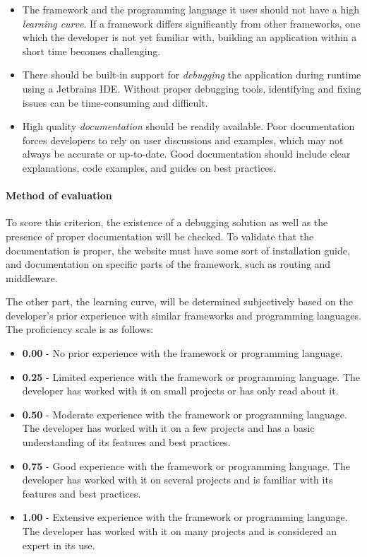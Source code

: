 \begin{itemize}
	\item The framework and the programming language it uses should not have a high \emph{learning curve}.
	      If a framework differs significantly from other frameworks, one which the developer is not yet familiar with, building an application within a short time becomes challenging.
	\item There should be built-in support for \emph{debugging} the application during runtime using a Jetbrains IDE.
	      Without proper debugging tools, identifying and fixing issues can be time-consuming and difficult.
	\item High quality \emph{documentation} should be readily available.
	      Poor documentation forces developers to rely on user discussions and examples, which may not always be accurate or up-to-date.
	      Good documentation should include clear explanations, code examples, and guides on best practices.
\end{itemize}

\paragraph{Method of evaluation}
To score this criterion, the existence of a debugging solution as well as the presence of proper documentation will be checked.
To validate that the documentation is proper, the website must have some sort of installation guide, and documentation on specific parts of the framework, such as routing and middleware.

The other part, the learning curve, will be determined subjectively based on the developer's prior experience with similar frameworks and programming languages.
The proficiency scale is as follows:

\begin{itemize}
	\item \textbf{0.00} - No prior experience with the framework or programming language.
	\item \textbf{0.25} - Limited experience with the framework or programming language.
	      The developer has worked with it on small projects or has only read about it.
	\item \textbf{0.50} - Moderate experience with the framework or programming language.
	      The developer has worked with it on a few projects and has a basic understanding of its features and best practices.
	\item \textbf{0.75} - Good experience with the framework or programming language.
	      The developer has worked with it on several projects and is familiar with its features and best practices.
	\item \textbf{1.00} - Extensive experience with the framework or programming language.
	      The developer has worked with it on many projects and is considered an expert in its use.
\end{itemize}

